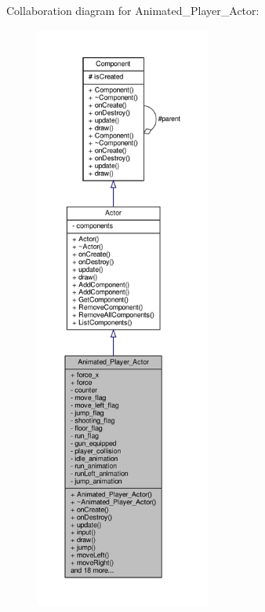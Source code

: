 Collaboration diagram for Animated\+\_\+\+Player\+\_\+\+Actor\+:
\nopagebreak
\begin{figure}[H]
\begin{center}
\leavevmode
\includegraphics[height=550pt]{classAnimated__Player__Actor__coll__graph}
\end{center}
\end{figure}
